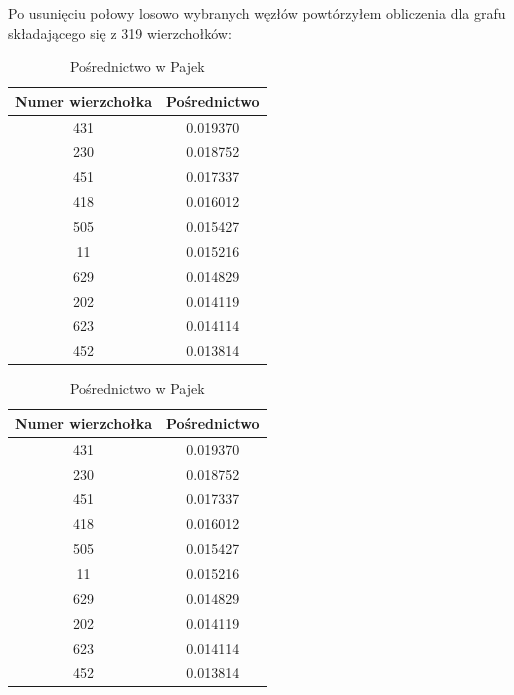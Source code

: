 \documentclass[a4paper,10pt]{article}
\begin{document}
			Po usunięciu połowy losowo wybranych węzłów powtórzyłem obliczenia dla grafu składającego się z 319 wierzchołków:
			\begin{table}[H]
			\parbox{.45\linewidth}{
			\caption*{Pośrednictwo w \mbox{NetworkX}}
			\begin{tabular}{ c | c } \hline
				Numer wierzchołka & Pośrednictwo \\ \hline
				431 & 0.019370 \\
				230 & 0.018752 \\
				451 & 0.017337 \\
				418 & 0.016012 \\
				505 & 0.015427 \\
				11  & 0.015216 \\
				629 & 0.014829 \\
				202 & 0.014119 \\
				623 & 0.014114 \\
				452 & 0.013814 \\\hline
			\end{tabular}
			}
			\hfill
			\parbox{.45\linewidth}{
			\caption*{Pośrednictwo w Pajek}
			\begin{tabular}{ c | c } \hline
				Numer wierzchołka & Pośrednictwo \\ \hline
				431 & 0.019370 \\
  				230 & 0.018752 \\
  				451 & 0.017337 \\ 
				418 & 0.016012 \\
				505 & 0.015427 \\
				11 & 0.015216  \\
				629 & 0.014829 \\
				202 & 0.014119 \\
				623 & 0.014114 \\
				452 & 0.013814 \\\hline
			\end{tabular}
			}
			\end{table}
			\pagebreak
\end{document}
